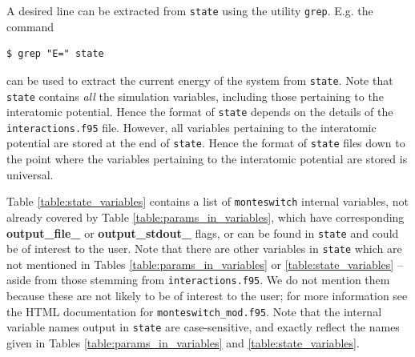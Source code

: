 \documentclass{report}
\begin{document}
A desired line can be extracted from \texttt{state} using the utility \texttt{grep}. E.g. the command
\begin{verbatim}
$ grep "E=" state
\end{verbatim}
can be used to extract the current energy of the system from \texttt{state}.
Note that \texttt{state} contains \emph{all} the simulation variables, including those
pertaining to the interatomic potential. Hence the format of \texttt{state} depends on the details of the \texttt{interactions.f95} file. However,
all variables pertaining to the interatomic potential are stored at the end of \texttt{state}. Hence the format of \texttt{state} files down to the
point where the variables pertaining to the interatomic potential are stored is universal.

Table \ref{table:state_variables} contains a list of \texttt{monteswitch} internal variables, not already covered by Table \ref{table:params_in_variables},
which have corresponding \textbf{output\_file\_} or \textbf{output\_stdout\_} flags, or can be found in \texttt{state} and could be of interest
to the user. Note that there are other variables in \texttt{state} which are not mentioned in Tables \ref{table:params_in_variables} or 
\ref{table:state_variables} -- aside from those stemming from \texttt{interactions.f95}. We do not mention them because these are not likely to be of
interest to the user; for more information see the HTML documentation for \texttt{monteswitch\_mod.f95}.
Note that the internal variable names output in \texttt{state} are case-sensitive, and exactly reflect the names given in Tables 
\ref{table:params_in_variables} and \ref{table:state_variables}.
\end{document}
